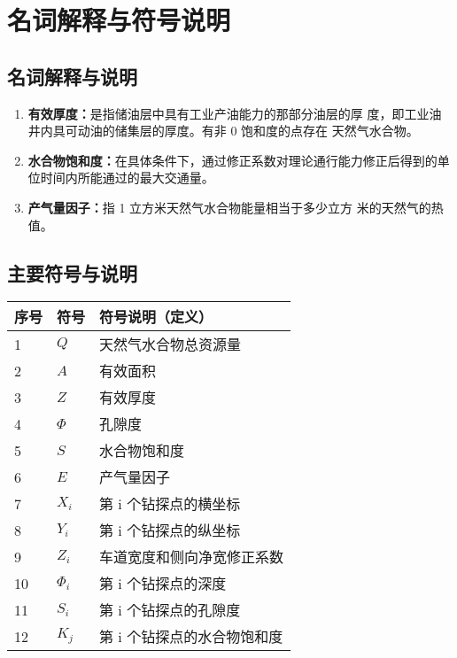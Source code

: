 \documentclass[12pt,a4paper]{nmmcm}
\newcommand\wordc[1]{\textbf{#1}}
\newcommand{\headcol}{\rowcolor{tableheadcolor}}
\begin{document}
\section{名词解释与符号说明}

\subsection{名词解释与说明}
\begin{enumerate}
  \item \wordc{有效厚度：}是指储油层中具有工业产油能力的那部分油层的厚
        度，即工业油井内具可动油的储集层的厚度。有非 0 饱和度的点存在
        天然气水合物。
  \item \wordc{水合物饱和度：}在具体条件下，通过修正系数对理论通行能力修正后得到的单
        位时间内所能通过的最大交通量。
  \item \wordc{产气量因子：}指 1 立方米天然气水合物能量相当于多少立方
        米的天然气的热值。

\end{enumerate}

\subsection{主要符号与说明}

\begin{table}[h!]
  \centering
  \small
  \begin{tabular}{p{60pt}<{\centering}|p{60pt}<{\centering}p{180pt}<{\raggedright}}
    \hline
    \headcol 序号 & 符号           & 符号说明（定义）           \\
    \hline
    1           & $ Q $        & 天然气水合物总资源量         \\
    2           & $A$   & 有效面积         \\
    3           & $Z$  & 有效厚度          \\
    4           & $\varPhi $  & 孔隙度          \\
    5           & $S$ & 水合物饱和度         \\
    6           & $E$   & 产气量因子 \\
    7           & $ X_{i} $  &第 i 个钻探点的横坐标             \\
    8           & $ Y_{i}$ & 第 i 个钻探点的纵坐标           \\
    9           & $Z_{i}$ & 车道宽度和侧向净宽修正系数      \\
    10          & $\varPhi_{i}$ & 第 i 个钻探点的深度            \\
    11          & $S_{i}$ & 第 i 个钻探点的孔隙度        \\
    12          & $K_{j}$      & 第 i 个钻探点的水合物饱和度             \\
    \hline
  \end{tabular}
  \label{symbol}
\end{table}
\end{document}
